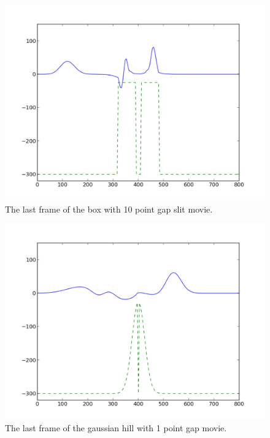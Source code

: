 \documentclass[twoside]{article}
\begin{document}
\begin{figure} 
  \centering
  \includegraphics[scale=0.4]{PdfImages/1d_box_slit10_final.pdf}
  \caption{The last frame of the box with 10 point gap slit movie.} \label{fig:box_1d_narrow}
\end{figure}

\begin{figure} 
  \centering
  \includegraphics[scale=0.4]{PdfImages/1d_gaussian_slit10_280.pdf}
  \caption{The last frame of the gaussian hill with 1 point gap movie.} \label{fig:box_1d_narrow}
\end{figure}
\end{document}
